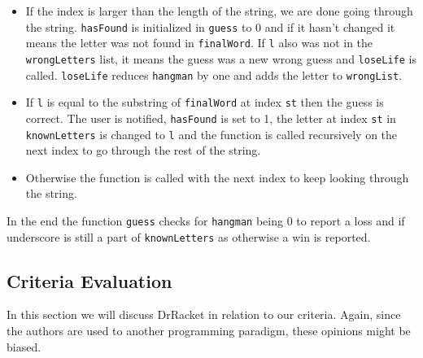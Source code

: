 \begin{itemize}
\item If the index is larger than the length of the string, we are done going through the string.
\lstinline!hasFound! is initialized in \lstinline!guess! to 0 and if it hasn't changed it means the letter was not found in \lstinline!finalWord!.
If \lstinline!l! also was not in the \lstinline!wrongLetters! list, it means the guess was a new wrong guess and \lstinline!loseLife! is called.
\lstinline!loseLife! reduces \lstinline!hangman! by one and adds the letter to \lstinline!wrongList!.
\item If \lstinline!l! is equal to the substring of \lstinline!finalWord! at index \lstinline!st! then the guess is correct.
The user is notified, \lstinline!hasFound! is set to 1, the letter at index \lstinline!st! in \lstinline!knownLetters! is changed to \lstinline!l! and the function is called recursively on the next index to go through the rest of the string.
\item Otherwise the function is called with the next index to keep looking through the string.
\end{itemize}

In the end the function \lstinline!guess! checks for \lstinline!hangman! being 0 to report a loss and if underscore is still a part of \lstinline!knownLetters! as otherwise a win is reported.

\subsection{Criteria Evaluation}
\label{subsec:criteval}
In this section we will discuss DrRacket in relation to our criteria. Again, since the authors are used to another programming paradigm, these opinions might be biased.

